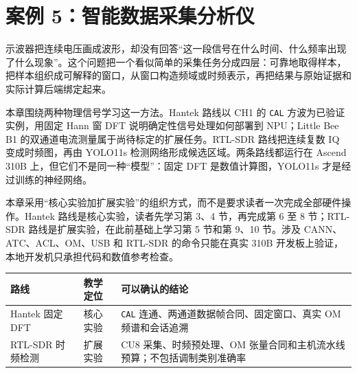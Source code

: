 \chapter{案例
5：智能数据采集分析仪}\label{ux6848ux4f8b-5ux667aux80fdux6570ux636eux91c7ux96c6ux5206ux6790ux4eea}

示波器把连续电压画成波形，却没有回答``这一段信号在什么时间、什么频率出现了什么现象''。这个问题把一个看似简单的采集任务分成四层：可靠地取得样本，把样本组织成可解释的窗口，从窗口构造频域或时频表示，再把结果与原始证据和实际计算后端绑定起来。

本章围绕两种物理信号学习这一方法。Hantek 路线以 CH1 的
\passthrough{\lstinline!CAL!} 方波为已验证实例，用固定 Hann 窗 DFT
说明确定性信号处理如何部署到 NPU；Little Bee B1
的双通道电流测量属于尚待标定的扩展任务。RTL-SDR 路线把连续复数 IQ
变成时频图，再由 YOLO11s 检测网络形成候选区域。两条路线都运行在 Ascend
310B 上，但它们不是同一种``模型''：固定 DFT 是数值计算图，YOLO11s
才是经过训练的神经网络。

本章采用``核心实验加扩展实验''的组织方式，而不是要求读者一次完成全部硬件操作。Hantek
路线是核心实验，读者先学习第 3、4 节，再完成第 6 至 8 节；RTL-SDR
路线是扩展实验，在此前基础上学习第 5 节和第 9、10 节。涉及
CANN、ATC、ACL、OM、USB 和 RTL-SDR 的命令只能在真实 310B
开发板上验证，本地开发机只承担代码和数值参考检查。

\begin{longtable}[]{@{}
  >{\raggedright\arraybackslash}p{}
  >{\raggedright\arraybackslash}p{}
  >{\raggedright\arraybackslash}p{}@{}}
\toprule\noalign{}
\begin{minipage}[b]{\linewidth}\raggedright
路线
\end{minipage} & \begin{minipage}[b]{\linewidth}\raggedright
教学定位
\end{minipage} & \begin{minipage}[b]{\linewidth}\raggedright
可以确认的结论
\end{minipage} \\
\midrule\noalign{}
\endhead
\bottomrule\noalign{}
\endlastfoot
Hantek 固定 DFT & 核心实验 & \passthrough{\lstinline!CAL!}
连通、两通道数据帧合同、固定窗口、真实 OM 频谱和会话追溯 \\
RTL-SDR 时频检测 & 扩展实验 & CU8 采集、时频预处理、OM
张量合同和主机流水线预算；不包括调制类别准确率 \\
\end{longtable}

